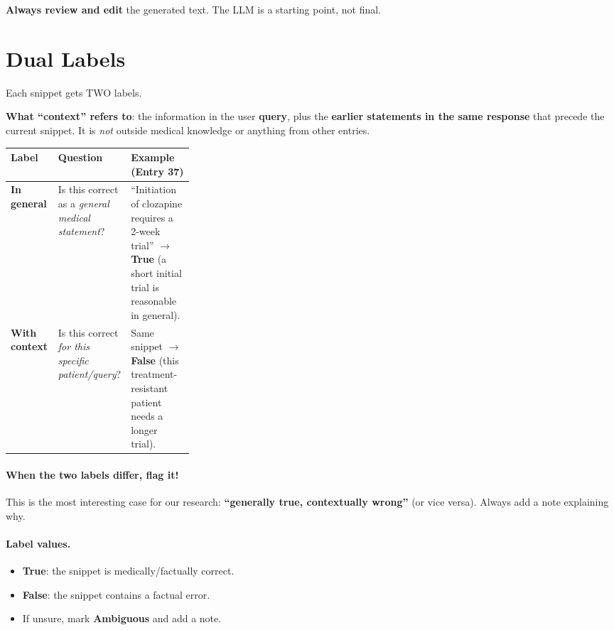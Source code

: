 \documentclass{article}
\begin{document}
\textbf{Always review and edit} the generated text. The LLM is a starting point, not final.


\section{Dual Labels}
\label{sec:dual-labels}

Each snippet gets TWO labels.

\textbf{What ``context'' refers to}: the information in the user \textbf{query}, plus the \textbf{earlier statements in the same response} that precede the current snippet. It is \textit{not} outside medical knowledge or anything from other entries.

\begin{table}[h]
\centering
\small
\begin{tabularx}{\linewidth}{@{}lp{0.30\linewidth}X@{}}
\toprule
\textbf{Label} & \textbf{Question} & \textbf{Example (Entry 37)} \\
\midrule
\textbf{In general} & Is this correct as a \textit{general medical statement}? & ``Initiation of clozapine requires a 2-week trial'' $\rightarrow$ \textbf{True} (a short initial trial is reasonable in general). \\
\addlinespace
\textbf{With context} & Is this correct \textit{for this specific patient/query}? & Same snippet $\rightarrow$ \textbf{False} (this treatment-resistant patient needs a longer trial). \\
\bottomrule
\end{tabularx}
\end{table}

\paragraph{When the two labels differ, flag it!}
This is the most interesting case for our research: \textbf{``generally true, contextually wrong''} (or vice versa). Always add a note explaining why.

\paragraph{Label values.}
\begin{itemize}[leftmargin=*,itemsep=2pt]
    \item \textbf{True}: the snippet is medically/factually correct.
    \item \textbf{False}: the snippet contains a factual error.
    \item If unsure, mark \textbf{Ambiguous} and add a note.
\end{itemize}
\end{document}
